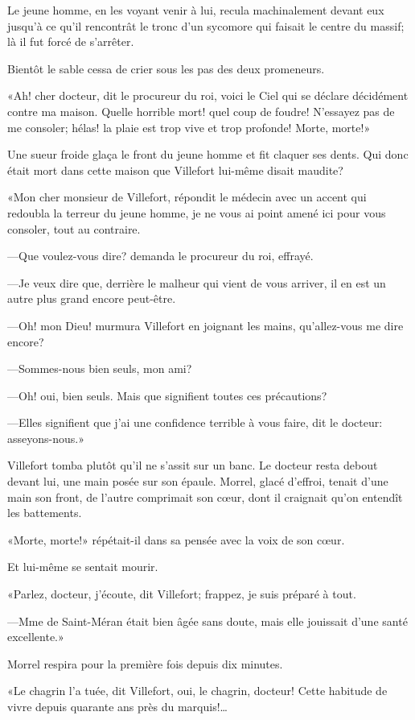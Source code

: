 Le jeune homme, en les voyant venir à lui, recula machinalement devant eux jusqu'à ce qu'il rencontrât le tronc d'un sycomore qui faisait le centre du massif; là il fut forcé de s'arrêter. 

Bientôt le sable cessa de crier sous les pas des deux promeneurs.  

«Ah! cher docteur, dit le procureur du roi, voici le Ciel qui se déclare décidément contre ma maison. Quelle horrible mort! quel coup de foudre! N'essayez pas de me consoler; hélas! la plaie est trop vive et trop profonde! Morte, morte!» 

Une sueur froide glaça le front du jeune homme et fit claquer ses dents. Qui donc était mort dans cette maison que Villefort lui-même disait maudite? 

«Mon cher monsieur de Villefort, répondit le médecin avec un accent qui redoubla la terreur du jeune homme, je ne vous ai point amené ici pour vous consoler, tout au contraire. 

—Que voulez-vous dire? demanda le procureur du roi, effrayé. 

—Je veux dire que, derrière le malheur qui vient de vous arriver, il en est un autre plus grand encore peut-être. 

—Oh! mon Dieu! murmura Villefort en joignant les mains, qu'allez-vous me dire encore? 

—Sommes-nous bien seuls, mon ami? 

—Oh! oui, bien seuls. Mais que signifient toutes ces précautions? 

—Elles signifient que j'ai une confidence terrible à vous faire, dit le docteur: asseyons-nous.» 

Villefort tomba plutôt qu'il ne s'assit sur un banc. Le docteur resta debout devant lui, une main posée sur son épaule. Morrel, glacé d'effroi, tenait d'une main son front, de l'autre comprimait son cœur, dont il craignait qu'on entendît les battements. 

«Morte, morte!» répétait-il dans sa pensée avec la voix de son cœur. 

Et lui-même se sentait mourir. 

«Parlez, docteur, j'écoute, dit Villefort; frappez, je suis préparé à tout. 

—Mme de Saint-Méran était bien âgée sans doute, mais elle jouissait d'une santé excellente.» 

Morrel respira pour la première fois depuis dix minutes. 

«Le chagrin l'a tuée, dit Villefort, oui, le chagrin, docteur! Cette habitude de vivre depuis quarante ans près du marquis!\dots 

